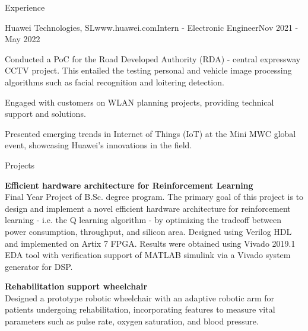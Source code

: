 \documentclass[
	11pt, %
]{./assets/resume} %
\begin{document}
\begin{rSection}{Experience}
	\begin{rSubsectionX}{Huawei Technologies, SL}{www.huawei.com}{Intern - Electronic Engineer}{Nov 2021 - May 2022}
		\item Conducted a PoC for the Road Developed Authority (RDA) - central expressway CCTV project. This entailed the testing personal and vehicle image processing algorithms such as facial recognition and loitering detection.
		\item Engaged with customers on WLAN planning projects, providing technical support and solutions. 
		\item Presented emerging trends in Internet of Things (IoT) at the Mini MWC global event, showcasing Huawei's innovations in the field.
	\end{rSubsectionX}

\end{rSection}


\begin{rSection}{Projects}

	\textbf{Efficient hardware architecture for Reinforcement Learning} \\
	Final Year Project of B.Sc. degree program. The primary goal of this project is to design and implement a novel efficient hardware architecture for reinforcement learning - i.e. the Q learning algorithm - by optimizing the tradeoff between power consumption, throughput, and silicon area. Designed using Verilog HDL and implemented on Artix 7 FPGA. Results were obtained using Vivado 2019.1 EDA tool with verification support of MATLAB simulink via a Vivado system generator for DSP.

	\textbf{Rehabilitation support wheelchair} \\
	Designed a prototype robotic wheelchair with an adaptive robotic arm for patients undergoing rehabilitation, incorporating features to measure vital parameters such as pulse rate, oxygen saturation, and blood pressure.

\end{rSection}


\end{document}
